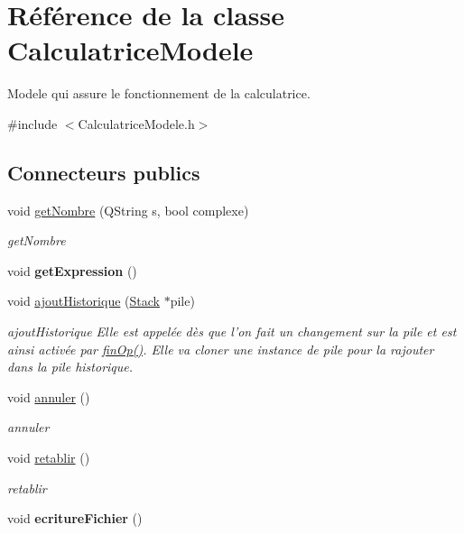 \hypertarget{class_calculatrice_modele}{\section{Référence de la classe Calculatrice\-Modele}
\label{class_calculatrice_modele}
}


Modele qui assure le fonctionnement de la calculatrice.  




{\ttfamily \#include $<$Calculatrice\-Modele.\-h$>$}

\subsection*{Connecteurs publics}
\begin{DoxyCompactItemize}
\item 
void \hyperlink{class_calculatrice_modele_a2214a44a1baedaaa580520967595b224}{get\-Nombre} (Q\-String s, bool complexe)
\begin{DoxyCompactList}\small\item\em get\-Nombre \end{DoxyCompactList}\item 
\hypertarget{class_calculatrice_modele_a381382f5fb175a17915a057009051d4a}{void {\bfseries get\-Expression} ()}\label{class_calculatrice_modele_a381382f5fb175a17915a057009051d4a}

\item 
\hypertarget{class_calculatrice_modele_aaaa8b6025095b0674a9244c197351cbc}{void \hyperlink{class_calculatrice_modele_aaaa8b6025095b0674a9244c197351cbc}{ajout\-Historique} (\hyperlink{class_stack}{Stack} $\ast$pile)}\label{class_calculatrice_modele_aaaa8b6025095b0674a9244c197351cbc}

\begin{DoxyCompactList}\small\item\em ajout\-Historique Elle est appelée dès que l'on fait un changement sur la pile et est ainsi activée par \hyperlink{class_calculatrice_modele_a17e47a75631ae25f15dfe0303ec85582}{fin\-Op()}. Elle va cloner une instance de pile pour la rajouter dans la pile historique. \end{DoxyCompactList}\item 
void \hyperlink{class_calculatrice_modele_a137a2699492e9989c74d1eb04c12cd5c}{annuler} ()
\begin{DoxyCompactList}\small\item\em annuler \end{DoxyCompactList}\item 
void \hyperlink{class_calculatrice_modele_a3ed52da71ebf6915d1efa1700fc7cc5c}{retablir} ()
\begin{DoxyCompactList}\small\item\em retablir \end{DoxyCompactList}\item 
\hypertarget{class_calculatrice_modele_a1e6e7fda54228e00a4a7adb17d72c0f3}{void {\bfseries ecriture\-Fichier} ()}\label{class_calculatrice_modele_a1e6e7fda54228e00a4a7adb17d72c0f3}


\end{DoxyCompactItemize}
